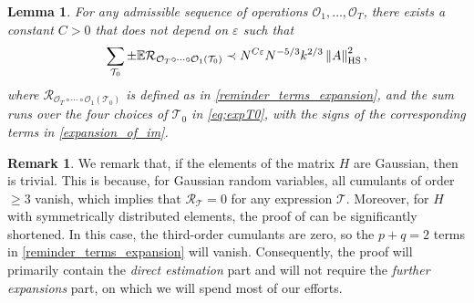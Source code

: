 \documentclass[10pt,reqno]{amsart}
\numberwithin{equation}{section}
\numberwithin{figure}{section}
\theoremstyle{plain} %
\newtheorem{lemma}[theorem]{Lemma}
\theoremstyle{definition} %
\newtheorem{remark}[theorem]{Remark}
\renewcommand{\txt}[1]{\text{\rm{#1}}}
\newcommand{\E}{\mathbb{E}}
\newcommand{\cT}{\mathcal T}
\newcommand{\cR}{{\mathcal R}}
\newcommand{\cO}{{\mathcal{O}}}
\renewcommand{\geq}{\ge}
\newcommand{\pa}[1]{\left({#1}\right)}
\newcommand{\norma}[1]{\left\lVert #1 \right\rVert}
\newcommand{\HS}{\txt{HS}}
\numberwithin{equation}{section}
\begin{document}
    \begin{lemma}\label{claim_estimate_remainder_terms}
        For any admissible sequence of operations $\cO_1,\ldots,\cO_T$, there exists a constant $C>0$ that does not depend on $\varepsilon$ such that
        \begin{equation}\nonumber
            \begin{aligned}
            \sum_{\cT_0}\pm\E\cR_{\cO_T\circ\cdots\circ\cO_1\pa{\cT_0}}\prec  N^{C\varepsilon}N^{-5/3}k^{2/3}\norma{A}_{\HS}^2, 
            \end{aligned}
        \end{equation}
        where $\cR_{\cO_T\circ\cdots\circ\cO_1\pa{\cT_0}}$ is defined as in \eqref{reminder_terms_expansion}, and the sum runs over the four choices of $\cT_0$ in \eqref{eq;expT0}, with the signs of the corresponding terms in \eqref{expansion_of_im}. %
    \end{lemma}

    
    \begin{remark}
We remark that, if the elements of the matrix $H$ are Gaussian, then  is trivial. This is because, for Gaussian random variables, all cumulants of order $\ge 3$ vanish, which implies that $\cR_\cT=0$ for any expression $\cT$. Moreover, for $H$ with symmetrically distributed elements, the proof of  can be significantly shortened. In this case, the third-order cumulants are zero, so the $p+q=2$ terms in \eqref{reminder_terms_expansion} will vanish. Consequently, the proof will primarily contain the \emph{direct estimation} part and will not require the \emph{further expansions} part, on which we will spend most of our efforts. 
    \end{remark}
    
\end{document}
